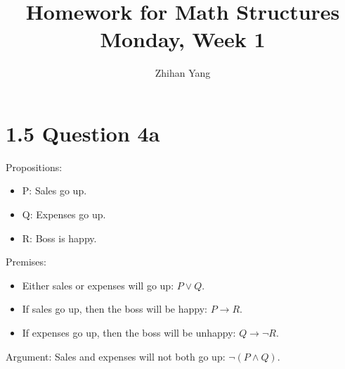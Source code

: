 \documentclass[12pt]{article}
\begin{document}
	
	\title{%
		Homework for Math Structures \\
		\large Monday, Week 1 
	}	
	\author{Zhihan Yang}
	\maketitle
	
	\section{1.5 Question 4a}
	
	Propositions:
	\begin{itemize}
		\item P: Sales go up.
		\item Q: Expenses go up.
		\item R: Boss is happy.
	\end{itemize}

	Premises:
	\begin{itemize}
		\item Either sales or expenses will go up: $P \lor Q$.
		\item If sales go up, then the boss will be happy: $P \rightarrow R$.
		\item If expenses go up, then the boss will be unhappy: $Q \rightarrow \lnot R$.
	\end{itemize}

	Argument: Sales and expenses will not both go up: $\lnot(P \land Q)$.
	
\end{document}
